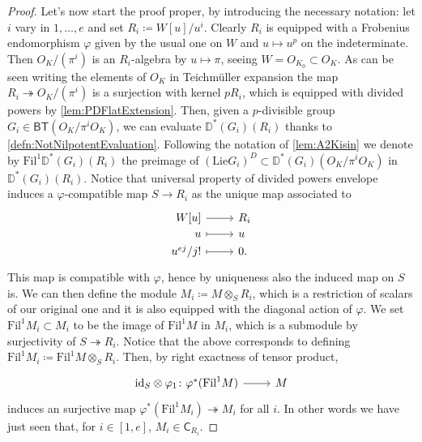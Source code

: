 \begin{proof}
Let's now start the proof proper, by introducing the necessary notation:
let $i$ vary in $1, \ldots, e$ and set $R_i \coloneqq W[u]/u^i$.
Clearly $R_i$ is equipped with a Frobenius endomorphism $\varphi$
given by the usual one on $W$ and $u \mapsto u^p$ on the indeterminate.
Then $O_K/ (\pi^i)$ is an $R_i$-algebra by $u \mapsto \pi$,
seeing $W = O_{K_0} \subset O_K$.
As can be seen writing the elements of $O_K$ in Teichmüller expansion
the map $R_i \twoheadrightarrow O_K/ (\pi^i)$ is a surjection
with kernel $pR_i$, which is equipped with divided powers by \cref{lem:PDFlatExtension}.
Then, given a $p$-divisible group $G_i \in \mathsf{BT}(O_K/\pi^iO_K)$,
we can evaluate $\mathbb{D}^*(G_i)(R_i)$ thanks to \cref{defn:NotNilpotentEvaluation}.
Following the notation of \cref{lem:A2Kisin}
we denote by $\mathrm{Fil}^1\mathbb{D}^*(G_i)(R_i)$
the preimage of $\left( \mathrm{Lie}G_i \right)^D \subset \mathbb{D}^*(G_i)(O_K/\pi^iO_K)$
in $\mathbb{D}^*(G_i)(R_i)$.
Notice that universal property of divided powers envelope
induces a $\varphi$-compatible map $S \to R_i$ as the unique map associated to
\begin{equation*}
\begin{tikzcd}[row sep = 0ex
	,/tikz/column 1/.append style={anchor=base east}
	,/tikz/column 2/.append style={anchor=base west}]
	W[u] \arrow[r, "", rightarrow] &
	R_i \\
	u \arrow[r, "", mapsto] & u \\
	u^{ej} / j!  \arrow[r, "", mapsto] & 0
.\end{tikzcd}
\end{equation*} 
This map is compatible with $\varphi$, hence by uniqueness also
the induced map on $S$ is.
We can then define the module $M_i \coloneqq M \otimes_S R_i$,
which is a restriction of scalars of our original one and
it is also equipped with the diagonal action of $\varphi$.
We set $\mathrm{Fil}^1 M_i \subset M_i$
to be the image of $\mathrm{Fil}^1 M$ in $M_i$, which is a submodule
by surjectivity of $S \twoheadrightarrow R_i$.
Notice that the above corresponds to defining $\mathrm{Fil}^1 M_i \coloneqq
\mathrm{Fil}^1 M \otimes_S R_i$.
Then, by right exactness of tensor product, 
\begin{equation*}
\begin{tikzcd}[row sep = 0ex
	,/tikz/column 1/.append style={anchor=base east}
	,/tikz/column 2/.append style={anchor=base west}]
	\mathrm{id}_{ S } \otimes \varphi_1
	\colon 
	\varphi^*(\mathrm{Fil}^1 M)\arrow[r, "", rightarrow] &
	M
\end{tikzcd}
\end{equation*} 
induces an surjective map $\varphi^*(\mathrm{Fil}^1 M_i) \twoheadrightarrow M_i$
for all $i$.
In other words we have just seen that, for $i \in [1,e]$,
$M_i \in \mathsf{C}_{R_i}$.


\end{proof}

